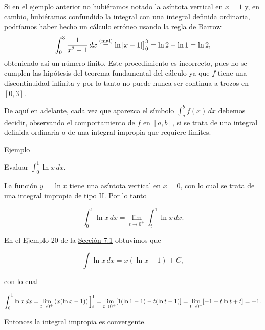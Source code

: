 \documentclass[
  letterpaper,
]{book}
\theoremstyle{plain}
\theoremstyle{remark}
\begin{document}
\begin{tcolorbox}[enhanced jigsaw, opacityback=0, left=2mm, opacitybacktitle=0.6, toprule=.15mm, bottomrule=.15mm, colbacktitle=quarto-callout-caution-color!10!white, titlerule=0mm, bottomtitle=1mm, title=\textcolor{quarto-callout-caution-color}{\faFire}\hspace{0.5em}{Importante}, toptitle=1mm, colframe=quarto-callout-caution-color-frame, colback=white, breakable, rightrule=.15mm, arc=.35mm, leftrule=.75mm, coltitle=black]

Si en el ejemplo anterior no hubiéramos notado la asíntota vertical en
\(x=1\) y, en cambio, hubiéramos confundido la integral con una integral
definida ordinaria, podríamos haber hecho un cálculo erróneo usando la
regla de Barrow \[
\int_{0}^{3}\frac{1}{x^{2}-1}\,dx
\stackrel{\text{(mal)}}{=}
\ln|x-1|\big{]}_{0}^{3} = \ln 2 - \ln 1 = \ln 2,
\] obteniendo así un número finito. Este procedimiento es incorrecto,
pues no se cumplen las hipótesis del teorema fundamental del cálculo ya
que \(f\) tiene una discontinuidad infinita y por lo tanto no puede
nunca ser continua a trozos en \([0,3]\).

De aquí en adelante, cada vez que aparezca el símbolo
\(\displaystyle \int_{a}^{b} f(x)\,dx\) debemos decidir, observando el
comportamiento de \(f\) en \([a,b]\), si se trata de una integral
definida ordinaria o de una integral impropia que requiere límites.

\end{tcolorbox}

Ejemplo

Evaluar \(\displaystyle \int_{0}^{1}\ln x\,dx\).

\begin{tcolorbox}[enhanced jigsaw, opacityback=0, left=2mm, opacitybacktitle=0.6, toprule=.15mm, bottomrule=.15mm, colbacktitle=quarto-callout-tip-color!10!white, titlerule=0mm, bottomtitle=1mm, title=\textcolor{quarto-callout-tip-color}{\faLightbulb}\hspace{0.5em}{Solución}, toptitle=1mm, colframe=quarto-callout-tip-color-frame, colback=white, breakable, rightrule=.15mm, arc=.35mm, leftrule=.75mm, coltitle=black]

La función \(y=\ln x\) tiene una asíntota vertical en \(x=0\), con lo
cual se trata de una integral impropia de tipo II. Por lo tanto

\[
\int_0^1 \ln x\,dx =\lim_{t\to 0^+} \int_t^1 \ln x\,dx.
\]

En el Ejemplo 20 de la \hyperref[seccion_7.1]{Sección 7.1} obtuvimos que

\[
\int \ln x\,dx=x(\ln x-1)+C,
\]

con lo cual

\[
\int_0^1 \ln x\,dx =\lim_{t\to 0^+} \left(x(\ln x -1)\right)\Big{]}_{t}^1=\lim_{t\to 0^+} [1(\ln 1-1)-t(\ln t-1)]=\lim_{t\to 0^+} [-1-t\ln t+t]=-1.
\]

Entonces la integral impropia es convergente.

\end{tcolorbox}
\end{document}

